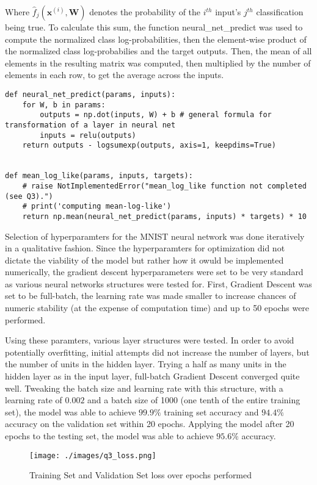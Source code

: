 Where $\hat{f}_{j} (\mathbf{x}^{(i)}, \mathbf{W})$ denotes the probability of the $i^{th}$ input's $j^{th}$ classification being true. To calculate this sum, the function neural\_net\_predict was used to compute the normalized class log-probabilities, then the element-wise product of the normalized class log-probabilies and the target outputs. Then, the mean of all elements in the resulting matrix was computed, then multiplied by the number of elements in each row, to get the average across the inputs.
\begin{verbatim}
def neural_net_predict(params, inputs):
    for W, b in params:
        outputs = np.dot(inputs, W) + b # general formula for transformation of a layer in neural net
        inputs = relu(outputs)
    return outputs - logsumexp(outputs, axis=1, keepdims=True)


def mean_log_like(params, inputs, targets):
    # raise NotImplementedError("mean_log_like function not completed (see Q3).")
    # print('computing mean-log-like')
    return np.mean(neural_net_predict(params, inputs) * targets) * 10
\end{verbatim}
\newpage
{}
Selection of hyperparamters for the MNIST neural network was done iteratively in a qualitative fashion. Since the hyperparamters for optimization did not dictate the viability of the model but rather how it owuld be implemented numerically, the gradient descent hyperparameters were set to be very standard as various neural networks structures were tested for. First, Gradient Descent was set to be full-batch, the learning rate was made smaller to increase chances of numeric stability (at the expense of computation time) and up to 50 epochs were performed.

Using these paramters, various layer structures were tested. In order to avoid potentially overfitting, initial attempts did not increase the number of layers, but the number of units in the hidden layer. Trying a half as many units in the hidden layer as in the input layer, full-batch Gradient Descent converged quite well. Tweaking the batch size and learning rate with this structure, with a learning rate of $0.002$ and a batch size of 1000 (one tenth of the entire training set), the model was able to achieve $99.9\%$ training set accuracy and $94.4\%$ accuracy on the validation set within 20 epochs. Applying the model after 20 epochs to the testing set, the model was able to achieve $95.6\%$ accuracy.

\begin{figure} [H]
\begin{center}
\texttt{[image: ./images/q3\_loss.png]}
\caption{Training Set and Validation Set loss over epochs performed}
\end{center}
\end{figure}

